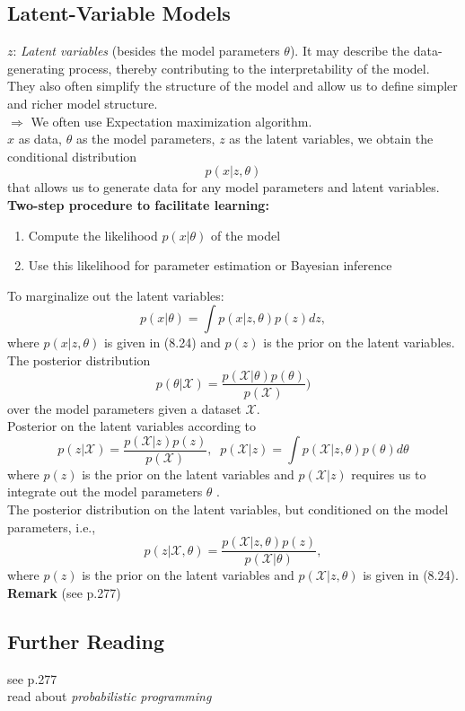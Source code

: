 \subsection{Latent-Variable Models}
$z$: \textit{Latent variables} (besides the model parameters $\theta$). It may describe the data-generating process, thereby contributing to the interpretability of the model. They also often simplify the structure of the model and allow us to define simpler and richer model structure. \\
$\Rightarrow$ We often use Expectation maximization algorithm. \\ 
$x$ as data, $\theta$ as the model parameters, $z$ as the latent variables, we obtain the conditional distribution 
\[
p(x|z,\theta) \tag{8.24}
\]
that allows us to generate data for any model parameters and latent variables. \\
\textbf{Two-step procedure to facilitate learning:}
\begin{enumerate}
	\item Compute the likelihood $p(x|\theta)$ of the model
	\item Use this likelihood for parameter estimation or Bayesian inference
\end{enumerate}
To marginalize out the latent variables:
\[
p(x|\theta) = \int p(x|z, \theta) p(z) dz, \tag{8.25}
\]
where $p(x|z, \theta)$ is given in (8.24) and $p(z)$ is the prior on the latent variables.\\
The posterior distribution 
\[
p(\theta | \mathcal{X}) = \frac{p(\mathcal{X} | \theta) p(\theta)}{p(\mathcal{X})}) \tag{8.26} 
\]
over the model parameters given a dataset $\mathcal{X}$.\\
Posterior on the latent variables according to
\[
p(z|\mathcal{X}) = \frac{p(\mathcal{X} | z) p(z)}{p(\mathcal{X})}, \; \; p(\mathcal{X} | z) = \int p(\mathcal{X} | z, \theta) p(\theta) d\theta \tag{8.27}
\]
where $p(z)$ is the prior on the latent variables and $p(\mathcal{X} | z)$ requires us to
integrate out the model parameters $\theta$ . \\
The posterior distribution on the latent variables, but conditioned on the model parameters, i.e.,
\[
p(z|\mathcal{X}, \theta) = \frac{p(\mathcal{X}| z, \theta) p(z)}{p(\mathcal{X} | \theta)}, \tag{8.28}
\]
where $p(z)$ is the prior on the latent variables and $p(\mathcal{X} | z, \theta)$ is given
in (8.24). \\
\textbf{Remark} (see p.277)

\subsection{Further Reading}
see p.277\\
read about \textit{probabilistic programming}

